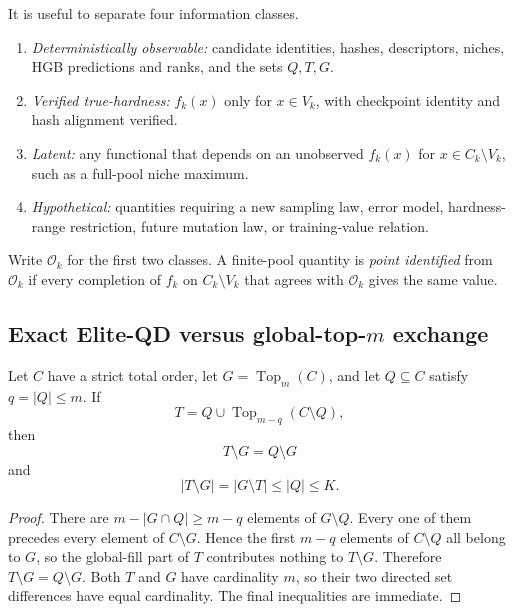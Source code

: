 It is useful to separate four information classes.
\begin{enumerate}
  \item \emph{Deterministically observable:} candidate identities, hashes,
  descriptors, niches, HGB predictions and ranks, and the sets $Q,T,G$.
  \item \emph{Verified true-hardness:} $f_k(x)$ only for $x\in V_k$, with
  checkpoint identity and hash alignment verified.
  \item \emph{Latent:} any functional that depends on an unobserved
  $f_k(x)$ for $x\in C_k\setminus V_k$, such as a full-pool niche maximum.
  \item \emph{Hypothetical:} quantities requiring a new sampling law, error
  model, hardness-range restriction, future mutation law, or training-value
  relation.
\end{enumerate}
Write $\mathcal O_k$ for the first two classes.  A finite-pool quantity is
\emph{point identified} from $\mathcal O_k$ if every completion of $f_k$ on
$C_k\setminus V_k$ that agrees with $\mathcal O_k$ gives the same value.

\subsection{Exact Elite-QD versus global-top-$m$ exchange}

\par
{}\par
{}\par

\begin{proposition}
\label{prop:qd-global-exchange}
Let $C$ have a strict total order, let $G=\operatorname{Top}_m(C)$, and let
$Q\subseteq C$ satisfy $q=|Q|\le m$.  If
\[
  T=Q\cup\operatorname{Top}_{m-q}(C\setminus Q),
\]
then
\[
  T\setminus G=Q\setminus G
\]
and
\[
 |T\setminus G|=|G\setminus T|\le |Q|\le K.
\]
\end{proposition}

\begin{proof}
There are $m-|G\cap Q|\ge m-q$ elements of $G\setminus Q$.  Every one of
them precedes every element of $C\setminus G$.  Hence the first $m-q$
elements of $C\setminus Q$ all belong to $G$, so the global-fill part of $T$
contributes nothing to $T\setminus G$.  Therefore
$T\setminus G=Q\setminus G$.  Both $T$ and $G$ have cardinality $m$, so their
two directed set differences have equal cardinality.  The final inequalities
are immediate.
\end{proof}

